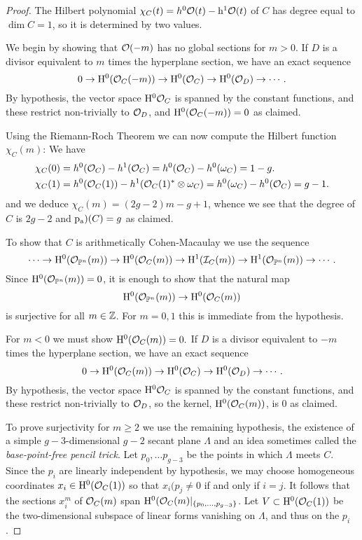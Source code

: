 \begin{proof} The Hilbert polynomial $\chi_{C}(t) = h^{0}{\mathcal O}(t)-{\rm h}^{1}{\mathcal O}(t)$ of $C$ has degree equal to
$\dim C = 1$, so it is determined by two values.

We begin by showing that ${\mathcal O}(-m)$ has no global sections for $m>0$.
If $D$ is a divisor equivalent to $m$ times the hyperplane section, we have an exact sequence
$$
0\to {\rm{H}}^{0}({\mathcal O}_{C}(-m)) \to {\rm{H}}^{0}({\mathcal O}_{C}) \to {\rm{H}}^{0}({\mathcal O}_{D}) \to \cdots.
$$
By hypothesis, the vector space ${\rm{H}}^{0}{\mathcal O}_{C}$ is spanned by the constant functions, and these
restrict non-trivially to ${\mathcal O}_{D}$, and ${\rm{H}}^{0}({\mathcal O}_{C}(-m)) = 0$ as claimed.

Using the Riemann-Roch Theorem we can now compute the Hilbert function $\chi_{C}(m)$:
We have 
\begin{align*}
 \chi_{C}(0) &= h^{0}({\mathcal O}_{C}) - h^{1}({\mathcal O}_{C}) = h^{0}({\mathcal O}_{C}) - h^{0}(\omega_{C}) = 1-g.\\
\chi_{C}(1) &= h^{0}({\mathcal O}_{C}(1)) - h^{1}({\mathcal O}_{C}(1)^{*}\otimes \omega_{C}) = h^{0}(\omega_{C}) - h^{0}({\mathcal O}_{C}) = g-1.
\end{align*}
and we deduce
$\chi_{C}(m) = (2g-2)m -g+1$, whence we see that the degree of $C$ is $2g-2$ and $\operatorname{\rm p_{a})}(C) = g$ as claimed.

To show that
$C$ is arithmetically Cohen-Macaulay we use the sequence
$$
\cdots \to {\rm{H}}^{0}({\mathcal O}_{{\mathbb P}^{n}}(m)) \to {\rm{H}}^{0}({\mathcal O}_{C}(m))
\to {\rm{H}}^{1}({\mathcal I}_{C}(m))\to {\rm{H}}^{1}({\mathcal O}_{{\mathbb P}^{n}}(m)) \to\cdots .
$$
Since ${\rm{H}}^{0}({\mathcal O}_{{\mathbb P}^{n}}(m)) = 0$, it
is enough to show that the natural map 
$$
{\rm{H}}^{0}({\mathcal O}_{{\mathbb P}^{n}}(m)) \to {\rm{H}}^{0}({\mathcal O}_{C}(m))
$$
 is surjective for all $m\in {\mathbb Z}$. For $m=0,1$ this is immediate from the hypothesis.

For $m <0$ we must show ${\rm{H}}^{0}({\mathcal O}_{C}(m))=0.$ 
If $D$ is a divisor equivalent to $-m$ times the hyperplane section, we have an exact sequence
$$
0\to {\rm{H}}^{0}({\mathcal O}_{C}(m)) 
\to {\rm{H}}^{0}({\mathcal O}_{C}) 
\to {\rm{H}}^{0}({\mathcal O}_{D}) \to \cdots.
$$
By hypothesis, the vector space ${\rm{H}}^{0}{\mathcal O}_{C}$ is spanned by the constant functions, and these
restrict non-trivially to ${\mathcal O}_{D}$, so the kernel, ${\rm{H}}^{0}({\mathcal O}_{C}(m))$, is 0 as claimed. 

To prove surjectivity for $m\geq 2$ we use the remaining hypothesis, the existence of
a simple $g-3$-dimensional $g-2$ secant plane $\Lambda$  and an idea sometimes called the \emph{base-point-free pencil trick}. Let $p_{0},\dots p_{g-3}$ be the points in which $\Lambda$ meets $C$.  Since the
$p_{i}$ are linearly independent by hypothesis, we may choose homogeneous coordinates $x_{i} \in {\rm{H}}^{0}({\mathcal O}_{C}(1))$ so that
$x_{i}(p_{j} \neq 0$ if and only if $i = j$. It follows that the sections
$x_{i}^{m}$ of ${\mathcal O}_{C}(m)$ span ${\rm{H}}^{0}({\mathcal O}_{C}(m)|_{\{p_{0}, \dots, p_{g-3}\}}$. Let 
$V\subset {\rm{H}}^{0}({\mathcal O}_{C}(1))$ be the two-dimensional subspace of linear forms vanishing on
$\Lambda$, and thus on the $p_{i}$. 


\end{proof}
